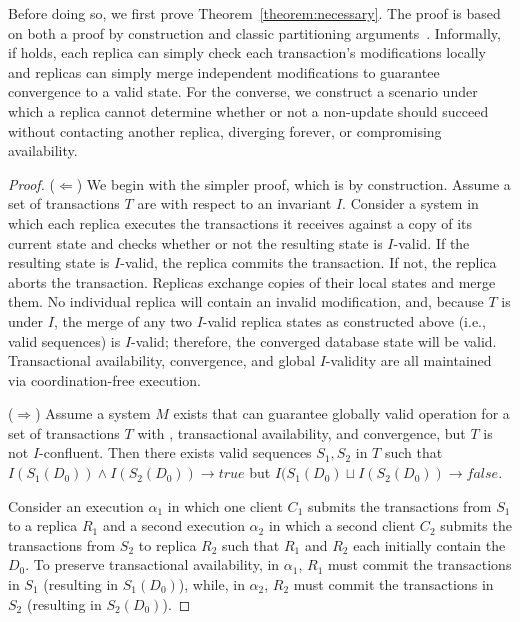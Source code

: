Before doing so, we first prove Theorem~\ref{theorem:necessary}. The
proof is based on both a proof by construction and classic
partitioning arguments~\cite{gilbert-cap}. Informally, if \iconfluence
holds, each replica can simply check each transaction's modifications
locally and replicas can simply merge independent modifications to
guarantee convergence to a valid state. For the converse, we construct
a scenario under which a replica cannot determine whether or not a
non-\iconfluent update should succeed without contacting another
replica, diverging forever, or compromising availability.

\begin{proof}
($\Leftarrow$) We begin with the simpler proof, which is by
  construction. Assume a set of transactions $T$ are \iconfluent with
  respect to an invariant $I$. Consider a system in which each replica
  executes the transactions it receives against a copy of its current
  state and checks whether or not the resulting state is $I$-valid. If
  the resulting state is $I$-valid, the replica commits the
  transaction. If not, the replica aborts the transaction. Replicas
  exchange copies of their local states and merge them. No individual
  replica will contain an invalid modification, and, because $T$ is
  \iconfluent under $I$, the merge of any two $I$-valid replica states
  as constructed above (i.e., valid sequences) is $I$-valid;
  therefore, the converged database state will be valid. Transactional
  availability, convergence, and global $I$-validity are all
  maintained via coordination-free execution.

($\Rightarrow$) Assume a system $M$ exists that can guarantee globally
  valid operation for a set of transactions $T$ with \cfreedom,
  transactional availability, and convergence, but $T$ is not
  $I$-confluent. Then there exists valid sequences $S_1,S_2$ in $T$
  such that $I(S_1(D_0)) \wedge I(S_2(D_0)) \rightarrow true$ but
  $I(S_1(D_0) \sqcup I(S_2(D_0)) \rightarrow false$.

  Consider an execution $\alpha_1$ in which one client $C_1$ submits
  the transactions from $S_1$ to a replica $R_1$ and a second
  execution $\alpha_2$ in which a second client $C_2$ submits the
  transactions from $S_2$ to replica $R_2$ such that $R_1$ and $R_2$
  each initially contain the $D_0$. To preserve transactional
  availability, in $\alpha_1$, $R_1$ must commit the transactions in
  $S_1$ (resulting in $S_1(D_0)$), while, in $\alpha_2$, $R_2$ must
  commit the transactions in $S_2$ (resulting in $S_2(D_0)$).


\end{proof}

